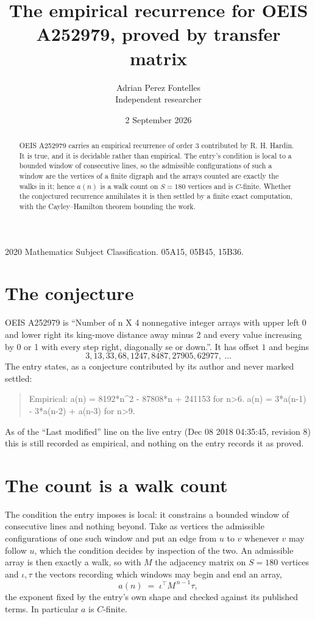 \documentclass[11pt,a4paper]{article}
\title{The empirical recurrence for OEIS A252979, proved by transfer matrix}
\author{Adrian Perez Fontelles\\ \small Independent researcher}
\date{2 September 2026}
\theoremstyle{plain}
\theoremstyle{definition}
\begin{document}
\maketitle

\begin{abstract}
OEIS A252979 carries an empirical recurrence of order $3$ contributed by R. H. Hardin. It is
true, and it is decidable rather than empirical. The entry's condition is local to a bounded window of consecutive lines, so
the admissible configurations of such a window are the vertices of a finite digraph and the
arrays counted are exactly the walks in it; hence $a(n)$ is a walk count on $S=180$ vertices
and is $C$-finite. Whether the conjectured recurrence annihilates it is then settled by a
finite exact computation, with the Cayley--Hamilton theorem bounding the work.
\end{abstract}

\noindent\small 2020 Mathematics Subject Classification. 05A15, 05B45, 15B36.\normalsize

\section{The conjecture}

OEIS A252979 is ``Number of n X 4 nonnegative integer arrays with upper left 0 and lower right its king-move distance away minus 2 and every value increasing by 0 or 1 with every step right, diagonally se or down.''. It has offset $1$ and begins
\[
3, 13, 33, 68, 1247, 8487, 27905, 62977,\ \dots
\]
The entry states, as a conjecture contributed by its author and never marked settled:
\begin{quote}
Empirical: a(n) = 8192*n\^{}2 - 87808*n + 241153 for n>6. a(n) = 3*a(n-1) - 3*a(n-2) + a(n-3) for n>9.
\end{quote}
As of the ``Last modified'' line on the live entry (Dec 08 2018 04:35:45, revision 8) this is still
recorded as empirical, and nothing on the entry records it as proved.

\section{The count is a walk count}

The condition the entry imposes is local: it constrains a bounded window of consecutive lines and nothing beyond. Take as
vertices the admissible configurations of one such window and put an edge from $u$ to $v$
whenever $v$ may follow $u$, which the condition decides by inspection of the two. An
admissible array is then exactly a walk, so with $M$ the adjacency matrix on $S=180$ vertices
and $\iota,\tau$ the vectors recording which windows may begin and end an array,
\[
a(n)\;=\;\iota^{\!\top}M^{\,n-1}\tau ,
\]
the exponent fixed by the entry's own shape and checked against its published terms. In
particular $a$ is $C$-finite.
\end{document}

